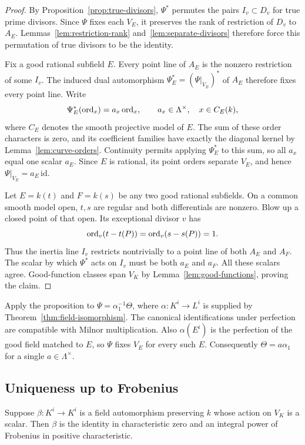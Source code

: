 \begin{proof}
By Proposition~\ref{prop:true-divisors}, $\Psi^*$ permutes the pairs
$I_v\subset D_v$ for true prime divisors. Since $\Psi$ fixes each
$V_E$, it preserves the rank of restriction of $D_v$ to $A_E$.
Lemmas~\ref{lem:restriction-rank} and~\ref{lem:separate-divisors}
therefore force this permutation of true divisors to be the identity.

Fix a good rational subfield $E$. Every point line of $A_E$ is the
nonzero restriction of some $I_v$. The induced dual automorphism
$\Psi_E^*=(\Psi|_{V_E})^*$ of $A_E$ therefore fixes every point line.
Write
\[
 \Psi_E^*(\operatorname{ord}_x)=a_x\operatorname{ord}_x,\qquad a_x\in\Lambda^\times,
 \quad x\in C_E(k),
\]
where $C_E$ denotes the smooth projective model of $E$. The sum of
these order characters is zero, and its coefficient families have
exactly the diagonal kernel by Lemma~\ref{lem:curve-orders}.
Continuity permits applying $\Psi_E^*$ to this sum, so all $a_x$ equal
one scalar $a_E$. Since $E$ is rational, its point orders separate
$V_E$, and hence $\Psi|_{V_E}=a_E\,\mathrm{id}$.

Let $E=k(t)$ and $F=k(s)$ be any two good rational subfields. On a
common smooth model open, $t,s$ are regular and both differentials
are nonzero. Blow up a closed point of that open. Its exceptional
divisor $v$ has
\[
 \operatorname{ord}_v(t-t(P))=\operatorname{ord}_v(s-s(P))=1.
\]
Thus the inertia line $I_v$ restricts nontrivially to a point line
of both $A_E$ and $A_F$. The scalar by which $\Psi^*$ acts on $I_v$
must be both $a_E$ and $a_F$. All these scalars agree. Good-function
classes span $V_K$ by Lemma~\ref{lem:good-functions}, proving the claim.
\end{proof}

Apply the proposition to $\Psi=\alpha_1^{-1}\Theta$, where
$\alpha:K^i\to L^i$ is supplied by Theorem~\ref{thm:field-isomorphism}.
The canonical identifications under perfection are compatible with
Milnor multiplication. Also $\alpha(E^i)$ is the perfection of the
good field matched to $E$, so $\Psi$ fixes $V_E$ for every such $E$.
Consequently $\Theta=a\alpha_1$ for a single $a\in\Lambda^\times$.

\subsection{Uniqueness up to Frobenius}

\begin{proposition}\label{prop:uniqueness}
Suppose $\beta:K^i\to K^i$ is a field automorphism preserving $k$
whose action on $V_K$ is a scalar. Then $\beta$ is the identity in
characteristic zero and an integral power of Frobenius in positive
characteristic.
\end{proposition}


